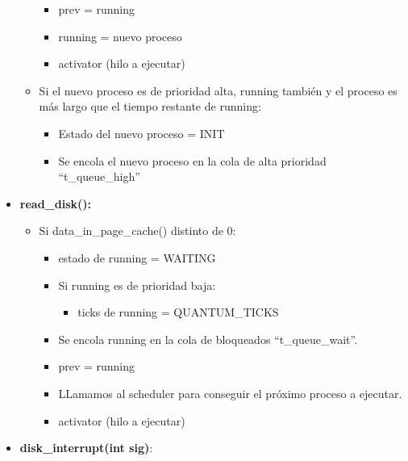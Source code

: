 \documentclass[10pt, spanish, pdftex]{template/UC3M_document}
\begin{document}
\begin{itemize}
\begin{itemize}
\begin{itemize}
            \item prev = running
            \item running = nuevo proceso
            \item activator (hilo a ejecutar)
        \end{itemize}
        \item Si el nuevo proceso es de prioridad alta, running también y el proceso es más largo que el tiempo restante de running:
        \vspace{-2mm}
    \begin{itemize}
     \setlength{\itemsep}{-1.5mm}
            \item Estado del nuevo proceso = INIT
            \item Se encola el nuevo proceso en la cola de alta prioridad “t\_queue\_high” 
        \end{itemize}
    \end{itemize}
    \item \textbf{read\_disk():}
    \vspace{-2mm}
    \begin{itemize}
     \setlength{\itemsep}{-1.5mm}
        \item Si data\_in\_page\_cache() distinto de 0:
        \vspace{-2mm}
    \begin{itemize}
     \setlength{\itemsep}{-1.5mm}
            \item estado de running = WAITING
            \item Si running es de prioridad baja:
            \vspace{-2mm}
    \begin{itemize}
     \setlength{\itemsep}{-1.5mm}
                \item ticks de running = QUANTUM\_TICKS
            \end{itemize}
            \item Se encola running en la cola de bloqueados “t\_queue\_wait”.
            \item prev = running
            \item LLamamos al scheduler para conseguir el próximo proceso a ejecutar.
            \item activator (hilo a ejecutar)
        \end{itemize}
    \end{itemize}
    \item \textbf{disk\_interrupt(int sig)}:
    \vspace{-2mm}

\end{itemize}
\end{document}

